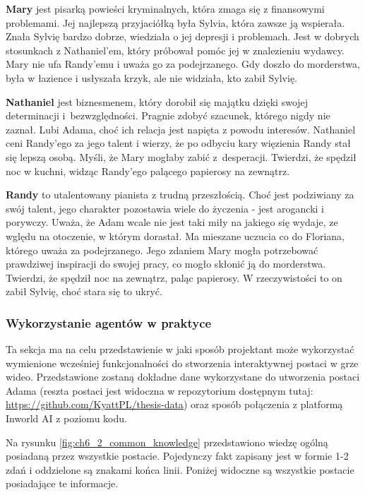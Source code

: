 \textbf{Mary} jest pisarką powieści kryminalnych, która zmaga się z finansowymi problemami. Jej najlepszą
przyjaciółką była Sylvia, która zawsze ją wspierała. Znała Sylvię bardzo dobrze, wiedziała o jej
depresji i problemach. Jest w dobrych stosunkach z Nathaniel'em, który próbował pomóc jej w
znalezieniu wydawcy. Mary nie ufa Randy'emu i uważa go za podejrzanego. Gdy doszło do morderstwa,
była w łazience i usłyszała krzyk, ale nie widziała, kto zabił Sylvię.

\textbf{Nathaniel} jest biznesmenem, który dorobił się majątku dzięki swojej determinacji i~bezwzględności.
Pragnie zdobyć szacunek, którego nigdy nie zaznał. Lubi Adama, choć ich relacja jest
napięta z powodu interesów. Nathaniel ceni Randy'ego za jego talent i wierzy, że po odbyciu kary
więzienia Randy stał się lepszą osobą. Myśli, że Mary mogłaby zabić z~desperacji. Twierdzi, że
spędził noc w kuchni, widząc Randy'ego palącego papierosy na zewnątrz.

\textbf{Randy} to utalentowany pianista z trudną przeszłością. Choć jest podziwiany za swój talent, jego
charakter pozostawia wiele do życzenia - jest arogancki i porywczy. Uważa, że Adam wcale nie jest taki
miły na jakiego się wydaje, ze wględu na otoczenie, w którym dorastał. Ma mieszane uczucia co do Floriana,
którego uważa za podejrzanego. Jego zdaniem Mary mogła potrzebować prawdziwej inspiracji do swojej pracy, co
mogło skłonić ją do morderstwa. Twierdzi, że spędził noc na zewnątrz, paląc papierosy. W rzeczywistości
to on zabił Sylvię, choć stara się to ukryć.

\subsubsection*{Wykorzystanie agentów w praktyce}

Ta sekcja ma na celu przedstawienie w jaki sposób projektant może wykorzystać wymienione wcześniej
funkcjonalności do stworzenia interaktywnej postaci w grze wideo. Przedstawione zostaną dokładne dane
wykorzystane do utworzenia postaci Adama (reszta postaci jest widoczna w repozytorium dostępnym tutaj:
\href{https://github.com/KyattPL/thesis-data}{https://github.com/KyattPL/thesis-data}) oraz
sposób połączenia z platformą Inworld AI z poziomu kodu.

\newpage

Na rysunku \ref{fig:ch6_2_common_knowledge} przedstawiono wiedzę ogólną posiadaną przez wszystkie postacie.
Pojedynczy fakt zapisany jest w formie 1-2 zdań i oddzielone są znakami końca linii. Poniżej widoczne
są wszystkie postacie posiadające te informacje.

